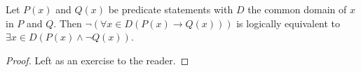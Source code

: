 \guard





\begin{prop}
\label{prop:negationOfUniversalConditionalStatement}
  Let $P(x)$ and $Q(x)$ be predicate statements with $D$ the common domain of $x$ in $P$ and $Q$.
  Then $\neg\left(\forall x\in D(P(x)\rightarrow Q(x))\right)$ is logically equivalent to $\exists x\in D(P(x) \wedge \neg Q(x) )$.
\end{prop}
\begin{proof}
  Left as an exercise to the reader.
\end{proof}
